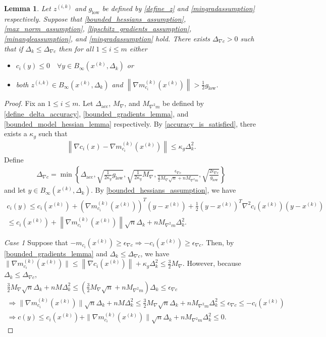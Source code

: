 \documentclass{article}
\newtheorem{lemma}[theorem]{Lemma}
\theoremstyle{case}
\numberwithin{theorem}{subsection}
\newcommand{\dacc}{{\Delta_{\textrm{acc}}}}
\newcommand{\dk}{\Delta_k}
\newcommand{\gmcik}{{\nabla m_{c_i}^{(k)}\left(\xk\right)}}
\newcommand{\maxgrad}{{M_{\nabla}}}
\newcommand{\maxmodelhessian}{{M_{\nabla^2 m}}}
\newcommand{\mingraddelta}{{\Delta_{\nabla c}}}
\newcommand{\mingradepsilon}{{\epsilon_{\nabla c}}}
\newcommand{\mingrad}{{ g_{\textrm{low}} }}
\newcommand{\tr}{{ B_{\infty}\left(\xk, \dk\right) }}
\newcommand{\xk}{{x^{(k)}}}
\newcommand{\zik}{{z^{(i, k)}}}
\begin{document}
\begin{lemma}
\label{only_small_z_matters}
Let $\zik$ and $\mingrad$ be defined by \cref{define_z} and \cref{mingradassumption} respectively.
Suppose that 
\cref{bounded_hessians_assumption},
\cref{max_norm_assumption},
\cref{lipschitz_gradients_assumption},
\cref{minangleassumption},
and \cref{mingradassumption} hold.
There exists $\mingraddelta > 0$ such that if $\dk \le \mingraddelta$ then for all $1 \le i \le m$ either
\begin{itemize}
\item $c_i(y) \le 0 \quad \forall y \in \tr$ or
\item both $\zik \in \tr$ and $\left\|\gmcik\right\| > \frac 1 2 \mingrad$.
\end{itemize}
\end{lemma}
\begin{proof}
Fix an $1 \le i \le m$.
Let
$\dacc$,
$\maxgrad$,
and $\maxmodelhessian$
be defined by
\cref{define_delta_accuracy},
\cref{bounded_gradients_lemma},
and \cref{bounded_model_hessian_lemma}
respectively.
By \cref{accuracy_is_satisfied}, there exists a $\kappa_g$ such that
\begin{align*}
\left\|\nabla c_i(x) - \gmcik\right\| \le \kappa_g \dk^2.
\end{align*}
Define
\begin{align}
\mingraddelta = \min\left\{
\dacc,
\sqrt{\frac 1 {2\kappa_g} \mingrad},
\sqrt{\frac 1 {2\kappa_g} \maxgrad},
\frac{\mingradepsilon}{\frac 3 2 \maxgrad\sqrt{n} + n\maxmodelhessian},
\sqrt{\frac{2\mingradepsilon}{\mingrad}}
\right\} \label{define_mingraddelta}
\end{align}
and let $y\in \tr$.
By \cref{bounded_hessians_assumption}, we have
\begin{align*}
c_i(y) \le c_i(\xk) + \left(\gmcik\right)^T(y - \xk) + \frac 1 2 \left(y - \xk\right)^T\nabla^2{c_i}(\xk)\left(y - \xk\right) \\
\le c_i(\xk) + \left\|\gmcik\right\|\sqrt{n}\dk +n\maxmodelhessian\dk^2.
\end{align*}

\emph{Case 1}
Suppose that $-m_{c_i}(\xk) \ge \mingradepsilon \Longrightarrow -c_i(\xk) \ge \mingradepsilon$.
Then, by \cref{bounded_gradients_lemma} and $\dk \le \mingraddelta$, we have
$\| \gmcik \| \le \left\|\nabla c_i(\xk)\right\| + \kappa_g \dk^2 \le \frac 3 2 \maxgrad$.
However, because $\dk \le \mingraddelta$, 
\begin{align*}
\frac 3 2 \maxgrad\sqrt{n}\dk + nM\dk^2 \le \left(\frac 3 2 \maxgrad\sqrt{n} + n\maxmodelhessian\right)\dk \le \mingradepsilon \\
\Longrightarrow \|\gmcik\|\sqrt{n}\dk + nM\dk^2 \le \frac 3 2 \maxgrad\sqrt{n}\dk + n\maxmodelhessian\dk^2 \le \mingradepsilon \le -c_i(\xk)\\
\Longrightarrow c(y) \le c_i(\xk) + \|\gmcik\|\sqrt{n}\dk + n\maxmodelhessian\dk^2 \le 0.
\end{align*}


\end{proof}
\end{document}
